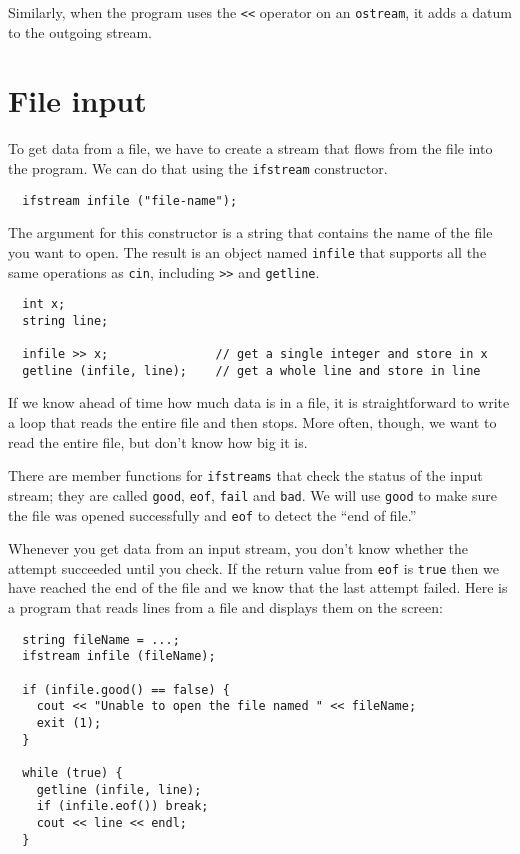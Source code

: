 
Similarly, when the program uses the {\tt <<} operator on
an {\tt ostream}, it adds a datum to the outgoing stream.

\section {File input}
\label{finput}

To get data from a file, we have to create a stream that flows
from the file into the program.  
We can do that using the {\tt ifstream} constructor.

\begin{lstlisting}
  ifstream infile ("file-name");
\end{lstlisting}
%
The argument for this constructor is a string that
contains the name of the file you want to open.  The result
is an object named {\tt infile} that supports all the same
operations as {\tt cin}, including {\tt >>} and {\tt getline}.

\begin{lstlisting}
  int x;
  string line;
    
  infile >> x;               // get a single integer and store in x
  getline (infile, line);    // get a whole line and store in line
\end{lstlisting}
%
If we know ahead of time how much data is in a file, it is 
straightforward to write a loop that reads the entire file and
then stops.  More often, though, we want to read the entire
file, but don't know how big it is.

There are member functions for {\tt ifstreams} that check the status
of the input stream; they are called {\tt good}, {\tt eof}, {\tt fail}
and {\tt bad}.  We will use {\tt good} to make sure the file was
opened successfully and {\tt eof} to detect the ``end of file.''


Whenever you get data from an input stream, you don't
know whether the attempt succeeded until you check.  If the
return value from {\tt eof} is {\tt true} then we have reached
the end of the file and we know that the last attempt failed.
Here is a program that reads lines from a file and displays
them on the screen:

\begin{lstlisting}
  string fileName = ...;
  ifstream infile (fileName);

  if (infile.good() == false) {
    cout << "Unable to open the file named " << fileName;
    exit (1);
  }

  while (true) {
    getline (infile, line);
    if (infile.eof()) break;
    cout << line << endl;
  }
\end{lstlisting}
%

